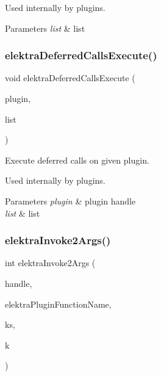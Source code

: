 Used internally by plugins.


\begin{DoxyParams}{Parameters}
{\em list} & list \\
\hline
\end{DoxyParams}
\mbox{\label{group__invoke_gad59c673dce3c2f08fbe52c5c667f55ce}} 
\subsubsection{\texorpdfstring{elektraDeferredCallsExecute()}{elektraDeferredCallsExecute()}}
{\footnotesize\ttfamily void elektra\+Deferred\+Calls\+Execute (\begin{DoxyParamCaption}\item[{Plugin $\ast$}]{plugin,  }\item[{Elektra\+Deferred\+Call\+List $\ast$}]{list }\end{DoxyParamCaption})}



Execute deferred calls on given plugin. 

Used internally by plugins.


\begin{DoxyParams}{Parameters}
{\em plugin} & plugin handle \\
\hline
{\em list} & list \\
\hline
\end{DoxyParams}
\mbox{\label{group__invoke_gaa257d93399c60f73c611205bbfa7c9a0}} 
\subsubsection{\texorpdfstring{elektraInvoke2Args()}{elektraInvoke2Args()}}
{\footnotesize\ttfamily int elektra\+Invoke2\+Args (\begin{DoxyParamCaption}\item[{Elektra\+Invoke\+Handle $\ast$}]{handle,  }\item[{const char $\ast$}]{elektra\+Plugin\+Function\+Name,  }\item[{Key\+Set $\ast$}]{ks,  }\item[{Key $\ast$}]{k }\end{DoxyParamCaption})}



